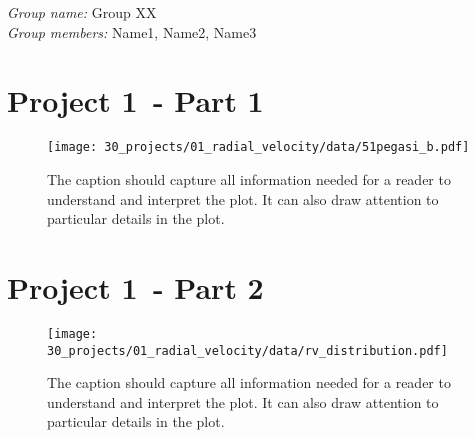 \documentclass{article}
\newcommand{\thename}{Group XX}
\newcommand{\theteam}{Name1, Name2, Name3}
\newcommand{\theweek}{1}
\newcommand{\theproject}{1}
\newcommand{\thedate}{\today}
\begin{document}
\pagestyle{fancy}
\fancyhf{}
\fancyhead[C]{Report - Week \theweek}
\fancyfoot[L]{\thedate}

\noindent \textit{Group name:} \thename \\
\textit{Group members:} \theteam

\section*{Project \theproject \, - Part 1}

\begin{SCfigure}[][h!]
\centering
\texttt{[image: 30\_projects/01\_radial\_velocity/data/51pegasi\_b.pdf]}
\caption{The caption should capture all information needed for a reader to understand and interpret the plot. It can also draw attention to particular details in the plot.}
\end{SCfigure}

\section*{Project \theproject \, - Part 2}

\begin{SCfigure}[][h!]
\centering
\texttt{[image: 30\_projects/01\_radial\_velocity/data/rv\_distribution.pdf]}
\caption{The caption should capture all information needed for a reader to understand and interpret the plot. It can also draw attention to particular details in the plot.}
\end{SCfigure}
\end{document}
